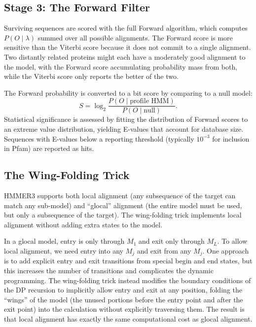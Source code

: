 \subsection{Stage 3: The Forward Filter}
\label{sec:forward-filter}

Surviving sequences are scored with the full Forward algorithm, which computes $P(O \mid \lambda)$ summed over all possible alignments.
The Forward score is more sensitive than the Viterbi score because it does not commit to a single alignment.
Two distantly related proteins might each have a moderately good alignment to the model, with the Forward score accumulating probability mass from both, while the Viterbi score only reports the better of the two.

The Forward probability is converted to a bit score by comparing to a null model:
\begin{equation}
\label{eq:forward-bitscore}
  S = \log_2 \frac{P(O \mid \text{profile HMM})}{P(O \mid \text{null})}.
\end{equation}
Statistical significance is assessed by fitting the distribution of Forward scores to an extreme value distribution, yielding E-values that account for database size.
Sequences with E-values below a reporting threshold (typically $10^{-3}$ for inclusion in Pfam) are reported as hits.

\subsection{The Wing-Folding Trick}
\label{sec:wing-folding}

HMMER3 supports both local alignment (any subsequence of the target can match any sub-model) and ``glocal'' alignment (the entire model must be used, but only a subsequence of the target).
The wing-folding trick implements local alignment without adding extra states to the model.

In a glocal model, entry is only through $M_1$ and exit only through $M_L$.
To allow local alignment, we need entry into any $M_j$ and exit from any $M_j$.
One approach is to add explicit entry and exit transitions from special begin and end states, but this increases the number of transitions and complicates the dynamic programming.
The wing-folding trick instead modifies the boundary conditions of the DP recursion to implicitly allow entry and exit at any position, folding the ``wings'' of the model (the unused portions before the entry point and after the exit point) into the calculation without explicitly traversing them.
The result is that local alignment has exactly the same computational cost as glocal alignment.


